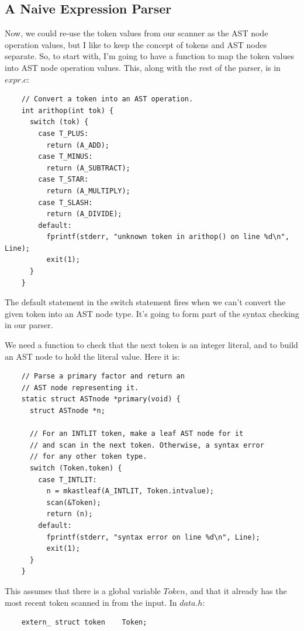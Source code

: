 \documentclass[journal, onecolumn, 12pt]{IEEEtran}
\begin{document}
\subsection{A Naive Expression Parser}

Now, we could re-use the token values from our scanner as the AST node operation values, but I like to keep the concept of tokens and AST nodes separate. So, to start with, I'm going to have a function to map the token values into AST node operation values. This, along with the rest of the parser, is in $expr.c$:

\begin{lstlisting}
    // Convert a token into an AST operation.
    int arithop(int tok) {
      switch (tok) {
        case T_PLUS:
          return (A_ADD);
        case T_MINUS:
          return (A_SUBTRACT);
        case T_STAR:
          return (A_MULTIPLY);
        case T_SLASH:
          return (A_DIVIDE);
        default:
          fprintf(stderr, "unknown token in arithop() on line %d\n", Line);
          exit(1);
      }
    }
\end{lstlisting}

The default statement in the switch statement fires when we can't convert the given token into an AST node type. It's going to form part of the syntax checking in our parser.

We need a function to check that the next token is an integer literal, and to build an AST node to hold the literal value. Here it is:

\begin{lstlisting}
    // Parse a primary factor and return an
    // AST node representing it.
    static struct ASTnode *primary(void) {
      struct ASTnode *n;

      // For an INTLIT token, make a leaf AST node for it
      // and scan in the next token. Otherwise, a syntax error
      // for any other token type.
      switch (Token.token) {
        case T_INTLIT:
          n = mkastleaf(A_INTLIT, Token.intvalue);
          scan(&Token);
          return (n);
        default:
          fprintf(stderr, "syntax error on line %d\n", Line);
          exit(1);
      }
    }
\end{lstlisting}

This assumes that there is a global variable $Token$, and that it already has the most recent token scanned in from the input. In $data.h$:

\begin{lstlisting}
    extern_ struct token    Token;
\end{lstlisting}
\end{document}
